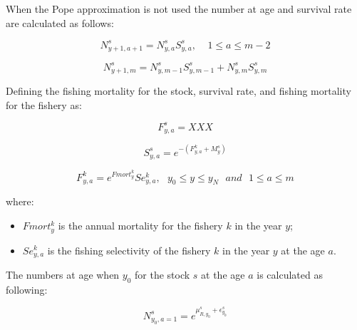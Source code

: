 \documentclass{article}
\begin{document}
When the Pope approximation is not used the number at age and survival rate are calculated as follows:

\begin{equation}
N^s_{y+1,a+1}=N^s_{y,a}S^s_{y,a}, \ \ \ \ \ 1\leq a \leq m-2
\end{equation}

\begin{equation}
N^s_{y+1,m}=N^s_{y,m-1}S^s_{y,m-1}+N^s_{y,m}S^s_{y,m}
\end{equation}

Defining the fishing mortality for the stock, survival rate, and fishing mortality for the fishery as:

\begin{equation}
F^s_{y,a} = XXX
\end{equation}

\begin{equation}
S^s_{y,a}=e^{-(F^k_{y,a}+M^{s}_{y})}
\end{equation}

\begin{equation}
F^k_{y,a}=e^{Fmort^k_y}Se^k_{y,a}, \ \ \ y_0\leq y \leq y_N \ \ \ and  \ \ \  1\leq a \leq m
\end{equation}

where:
\begin{itemize}

    
    \item $Fmort^k_y$ is the annual mortality for the fishery $k$ in the year $y$;
    \item $Se^k_{y,a}$ is the fishing selectivity of the fishery $k$ in the year $y$ at the age $a$.

\end{itemize}

\hfill

The numbers at age when $y_0$ for the stock $s$ at the age $a$ is calculated as following:

\begin{equation}
N^s_{y_0,a=1}=e^{\mu^s_{R,y_0} + \epsilon^s_{y_0}}
\end{equation}
\end{document}
